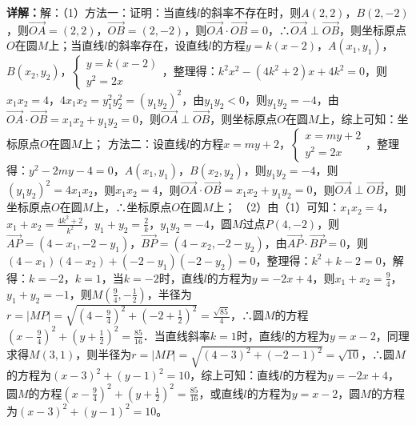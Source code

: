 \begin{question}[points=12]
\begin{solution}
\textbf{详解：}解：（1）方法一：证明：当直线$l$的斜率不存在时，则$A(2,2)$，$B(2,-2)$，则$\overrightarrow{OA}=(2,2)$，$\overrightarrow{OB}=(2,-2)$，则$\overrightarrow{OA}\cdot\overrightarrow{OB}=0$，∴$\overrightarrow{OA}\perp\overrightarrow{OB}$，则坐标原点$O$在圆$M$上；当直线$l$的斜率存在，设直线$l$的方程$y=k(x-2)$，$A(x_1,y_1)$，$B(x_2,y_2)$，$\begin{cases} y=k(x-2) \\ y^2=2x \end{cases}$，整理得：$k^2x^2-(4k^2+2)x+4k^2=0$，则$x_1x_2=4$，$4x_1x_2=y_1^2y_2^2=(y_1y_2)^2$，由$y_1y_2<0$，则$y_1y_2=-4$，由$\overrightarrow{OA}\cdot\overrightarrow{OB}=x_1x_2+y_1y_2=0$，则$\overrightarrow{OA}\perp\overrightarrow{OB}$，则坐标原点$O$在圆$M$上，综上可知：坐标原点$O$在圆$M$上；
方法二：设直线$l$的方程$x=my+2$，$\begin{cases} x=my+2 \\ y^2=2x \end{cases}$，整理得：$y^2-2my-4=0$，$A(x_1,y_1)$，$B(x_2,y_2)$，则$y_1y_2=-4$，则$(y_1y_2)^2=4x_1x_2$，则$x_1x_2=4$，则$\overrightarrow{OA}\cdot\overrightarrow{OB}=x_1x_2+y_1y_2=0$，则$\overrightarrow{OA}\perp\overrightarrow{OB}$，则坐标原点$O$在圆$M$上，∴坐标原点$O$在圆$M$上；
（2）由（1）可知：$x_1x_2=4$，$x_1+x_2=\frac{4k^2+2}{k^2}$，$y_1+y_2=\frac{2}{k}$，$y_1y_2=-4$，圆$M$过点$P(4,-2)$，则$\overrightarrow{AP}=(4-x_1,-2-y_1)$，$\overrightarrow{BP}=(4-x_2,-2-y_2)$，由$\overrightarrow{AP}\cdot\overrightarrow{BP}=0$，则$(4-x_1)(4-x_2)+(-2-y_1)(-2-y_2)=0$，整理得：$k^2+k-2=0$，解得：$k=-2$，$k=1$，当$k=-2$时，直线$l$的方程为$y=-2x+4$，则$x_1+x_2=\frac{9}{4}$，$y_1+y_2=-1$，则$M(\frac{9}{4},-\frac{1}{2})$，半径为$r=|MP|=\sqrt{(4-\frac{9}{4})^2+(-2+\frac{1}{2})^2}=\frac{\sqrt{85}}{4}$，∴圆$M$的方程$(x-\frac{9}{4})^2+(y+\frac{1}{2})^2=\frac{85}{16}$．当直线斜率$k=1$时，直线$l$的方程为$y=x-2$，同理求得$M(3,1)$，则半径为$r=|MP|=\sqrt{(4-3)^2+(-2-1)^2}=\sqrt{10}$，∴圆$M$的方程为$(x-3)^2+(y-1)^2=10$，综上可知：直线$l$的方程为$y=-2x+4$，圆$M$的方程$(x-\frac{9}{4})^2+(y+\frac{1}{2})^2=\frac{85}{16}$，或直线$l$的方程为$y=x-2$，圆$M$的方程为$(x-3)^2+(y-1)^2=10$。
\end{solution}
\end{question}

